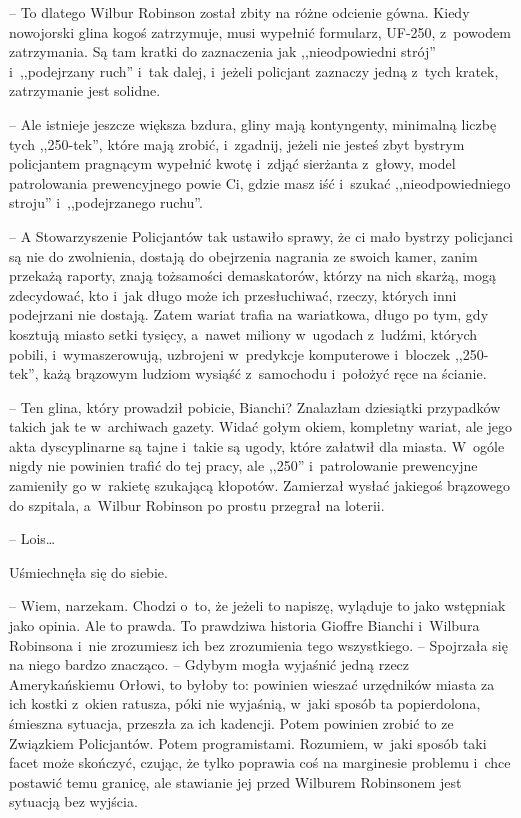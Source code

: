 \documentclass[oneside,polish,11pt,sfheadings]{mwbk}
\begin{document}
-- To dlatego Wilbur Robinson został zbity na różne odcienie gówna. Kiedy
nowojorski glina kogoś zatrzymuje, musi wypełnić formularz, UF-250, z~powodem zatrzymania. Są tam kratki do zaznaczenia jak ,,nieodpowiedni
strój'' i~,,podejrzany ruch'' i~tak dalej, i~jeżeli policjant zaznaczy
jedną z~tych kratek, zatrzymanie jest solidne.

-- Ale istnieje jeszcze większa bzdura, gliny mają kontyngenty, minimalną
liczbę tych ,,250-tek'', które mają zrobić, i~zgadnij, jeżeli nie jesteś
zbyt bystrym policjantem pragnącym wypełnić kwotę i~zdjąć sierżanta z~głowy, model patrolowania prewencyjnego powie Ci, gdzie masz iść i~szukać ,,nieodpowiedniego stroju'' i~,,podejrzanego ruchu''.

-- A Stowarzyszenie Policjantów tak ustawiło sprawy, że ci mało bystrzy
policjanci są nie do zwolnienia, dostają do obejrzenia nagrania ze
swoich kamer, zanim przekażą raporty, znają tożsamości demaskatorów,
którzy na nich skarżą, mogą zdecydować, kto i~jak długo może ich
przesłuchiwać, rzeczy, których inni podejrzani nie dostają. Zatem wariat
trafia na wariatkowa, długo po tym, gdy kosztują miasto setki tysięcy, a~nawet miliony w~ugodach z~ludźmi, których pobili, i~wymaszerowują,
uzbrojeni w~predykcje komputerowe i~bloczek ,,250-tek'', każą brązowym
ludziom wysiąść z~samochodu i~położyć ręce na ścianie.

-- Ten glina, który prowadził pobicie, Bianchi? Znalazłam dziesiątki
przypadków takich jak te w~archiwach gazety. Widać gołym okiem,
kompletny wariat, ale jego akta dyscyplinarne są tajne i~takie są ugody,
które załatwił dla miasta. W~ogóle nigdy nie powinien trafić do tej
pracy, ale ,,250'' i~patrolowanie prewencyjne zamieniły go w~rakietę
szukającą kłopotów. Zamierzał wysłać jakiegoś brązowego do szpitala, a~Wilbur Robinson po prostu przegrał na loterii.

-- Lois\ldots 

Uśmiechnęła się do siebie. 

-- Wiem, narzekam. Chodzi o~to, że jeżeli to
napiszę, wyląduje to jako wstępniak jako opinia. Ale to prawda. To
prawdziwa historia Gioffre Bianchi i~Wilbura Robinsona i~nie zrozumiesz
ich bez zrozumienia tego wszystkiego. -- Spojrzała się na niego bardzo
znacząco. -- Gdybym mogła wyjaśnić jedną rzecz Amerykańskiemu Orłowi, to
byłoby to: powinien wieszać urzędników miasta za ich kostki z~okien
ratusza, póki nie wyjaśnią, w~jaki sposób ta popierdolona, śmieszna
sytuacja, przeszła za ich kadencji. Potem powinien zrobić to ze
Związkiem Policjantów. Potem programistami. Rozumiem, w~jaki sposób taki
facet może skończyć, czując, że tylko poprawia coś na marginesie
problemu i~chce postawić temu granicę, ale stawianie jej przed Wilburem
Robinsonem jest sytuacją bez wyjścia.
\end{document}
